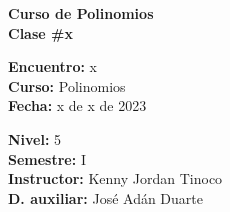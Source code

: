 \begin{center} \textbf
{
    \Large Curso de Polinomios \\ \vspace{2mm}Clase \#x
}
\end{center}

\begin{multicols}{2}
{
    \textbf{Encuentro:} x\\
    \textbf{Curso:} Polinomios\\
    \textbf{Fecha:} x de x de 2023\\
    \begin{flushright}
        \textbf{Nivel:} 5\\
        \textbf{Semestre:} I\\
        \textbf{Instructor:} Kenny Jordan Tinoco\\
        \textbf{D. auxiliar: }José Adán Duarte
    \end{flushright}
}
\end{multicols}

\thispagestyle{first-page-style}